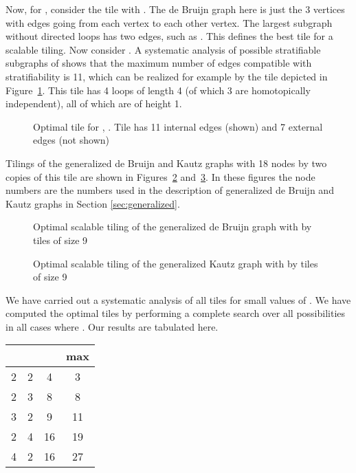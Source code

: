 \documentclass[12pt]{article}
\begin{document}
Now, for , consider the tile with .  The de Bruijn graph
here is just the 3 vertices  with edges going from each
vertex to each other vertex.  The largest subgraph without directed
loops has two edges, such as .  This
defines the best tile for a scalable tiling.  Now consider .  A
systematic analysis of possible stratifiable subgraphs of  shows that the maximum number of edges compatible with
stratifiability is 11, which can be realized for example by the tile
depicted in Figure~\ref{f:tile-32}.  This tile has 4 loops of length 4
(of which 3 are homotopically independent), all of which are of height
1.
\begin{figure}
\begin{center}
\end{center}
\caption[x]{\footnotesize Optimal tile for , .  Tile has
11 internal edges  (shown) and 7 external edges (not shown)}
\label{f:tile-32}
\end{figure}
Tilings of the generalized de Bruijn and Kautz graphs with 18 nodes by
two copies of this tile are shown in Figures~\ref{f:d9-18}
and~\ref{f:k9-18}.  In  these figures the node numbers are the
numbers  used in the description of generalized de Bruijn and Kautz
graphs in Section \ref{sec:generalized}.
\begin{figure}
\begin{center}
\end{center}
\caption[x]{\footnotesize Optimal scalable tiling of the generalized
  de Bruijn graph with  by tiles of size 9}
\label{f:d9-18}
\end{figure}
\begin{figure}
\begin{center}
\end{center}
\caption[x]{\footnotesize Optimal scalable tiling of the generalized
Kautz graph with  by tiles of size 9}
\label{f:k9-18}
\end{figure}


We have carried out a systematic analysis of all tiles for small
values of .  We have computed the optimal tiles by performing a
complete search over all possibilities in all cases where .
Our results are
tabulated here.

\begin{center}
\begin{tabular}{| c | c | c | | c |}
\hline
  &  &   & max \\
\hline
2 & 2 & 4 & 3\\
2 & 3 & 8 & 8\\
3 & 2 & 9 & 11\\
2 & 4 & 16 & 19\\
4 & 2 & 16 & 27\\
\hline
\end{tabular}
\end{center}
\end{document}
